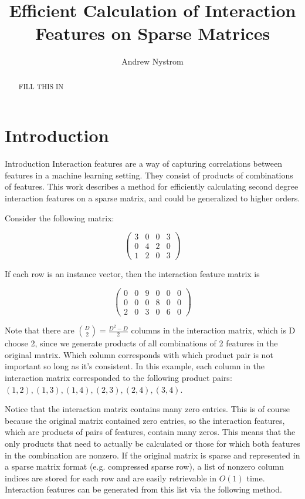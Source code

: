 \documentclass[twoside,11pt]{article}
\begin{document}
\title{Efficient Calculation of Interaction Features on Sparse Matrices}
\author{Andrew Nystrom}
\date{}

\maketitle

\begin{abstract}%
FILL THIS IN
\end{abstract}

\section{Introduction}

Introduction
Interaction features are a way of capturing correlations between features in a machine 
learning setting. They consist of products of combinations of features. This work 
describes a method for efficiently calculating second degree interaction features on a 
sparse matrix, and could be generalized to higher orders.

Consider the following matrix:

\[ \left( \begin{array}{cccc}
3 & 0 & 0 & 3 \\
0 & 4 & 2 & 0 \\
1 & 2 & 0 & 3 \end{array} \right)\]


If each row is an instance vector, then the interaction feature matrix is

\[ \left( \begin{array}{cccccc}
0 & 0 & 9 & 0 & 0 & 0 \\
0 & 0 & 0 & 8 & 0 & 0 \\
2 & 0 & 3 & 0 & 6 & 0 \end{array} \right)\]

Note that there are $\binom{D}{2} = \frac{D^2-D}{2}$ columns in the interaction matrix, which is D choose 2, 
since we generate products of all combinations of 2 features in the original matrix. 
Which column corresponds with which product pair is not important so long as it’s 
consistent. In this example, each column in the interaction matrix corresponded to the 
following product pairs: $(1, 2),  (1, 3),  (1, 4),  (2, 3), ( 2, 4), (3, 4)$.

Notice that the interaction matrix contains many zero entries. This is of course because 
the original matrix contained zero entries, so the interaction features, which are 
products of pairs of features, contain many zeros. This means that the only products that 
need to actually be calculated or those for which both features in the combination are 
nonzero. If the original matrix is sparse and represented in a sparse matrix format 
(e.g. compressed sparse row), a list of nonzero column indices are stored for each row 
and are easily retrievable in $O(1)$ time. Interaction features can be generated from this 
list via the following method.
\end{document}
